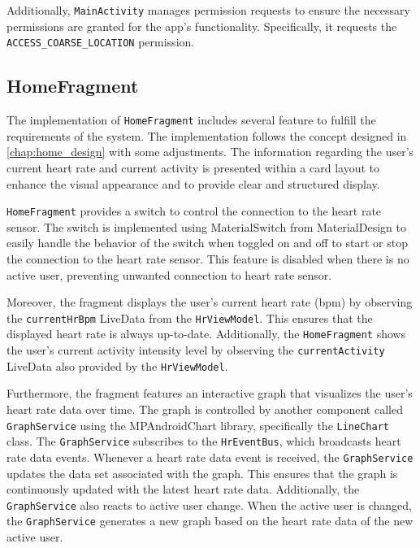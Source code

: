Additionally, \texttt{MainActivity} manages permission requests to ensure the necessary permissions are granted for the app's functionality. Specifically, it requests the \texttt{ACCESS\_COARSE\_LOCATION} permission.

\subsection{HomeFragment}
The implementation of \texttt{HomeFragment} includes several feature to fulfill the requirements of the system. 
The implementation follows the concept designed in \autoref{chap:home_design} with some adjustments.
The information regarding the user's current heart rate and current activity is presented within a card layout to enhance the visual appearance and to provide clear and structured display.

\texttt{HomeFragment} provides a switch to control the connection to the heart rate sensor. 
The switch is implemented using MaterialSwitch from MaterialDesign to easily handle the behavior of the switch when toggled on and off to start or stop the connection to the heart rate sensor.
This feature is disabled when there is no active user, preventing unwanted connection to heart rate sensor.

Moreover, the fragment displays the user's current heart rate (bpm) by observing the \texttt{currentHrBpm} LiveData from the \texttt{HrViewModel}. This ensures that the displayed heart rate is always up-to-date.
Additionally, the \texttt{HomeFragment} shows the user's current activity intensity level by observing the \texttt{currentActivity} LiveData also provided by the \texttt{HrViewModel}. 

Furthermore, the fragment features an interactive graph that visualizes the user's heart rate data over time. 
The graph is controlled by another component called \texttt{GraphService} using the MPAndroidChart library, specifically the \texttt{LineChart} class.
The \texttt{GraphService} subscribes to the \texttt{HrEventBus}, which broadcasts heart rate data events. 
Whenever a heart rate data event is received, the \texttt{GraphService} updates the data set associated with the graph. 
This ensures that the graph is continuously updated with the latest heart rate data.
Additionally, the \texttt{GraphService} also reacts to active user change. 
When the active user is changed, the \texttt{GraphService} generates a new graph based on the heart rate data of the new active user. 

